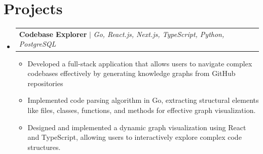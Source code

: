 \documentclass[letterpaper,11pt]{article}
\makeatletter
\newcommand{\resumeItem}[1]{
  \item\small{
    {#1 \vspace{-2pt}}
  }
}
\newcommand{\resumeProjectHeading}[2]{
    \item
    \begin{tabular*}{0.97\textwidth}{l@{\extracolsep{\fill}}r}
      \small#1 & #2 \\
    \end{tabular*}\vspace{-7pt}
}
\newcommand{\resumeSubHeadingListStart}{\begin{itemize}[leftmargin=0.15in, label={}]}
\newcommand{\resumeSubHeadingListEnd}{\end{itemize}}
\newcommand{\resumeItemListStart}{\begin{itemize}}
\newcommand{\resumeItemListEnd}{\end{itemize}\vspace{-5pt}}
\makeatother
\begin{document}
\section{Projects}
    \resumeSubHeadingListStart
        \resumeProjectHeading
          {\textbf{Codebase Explorer} $|$ \normalfont\emph{\small Go, React.js, Next.js, TypeScript, Python, PostgreSQL}}{}
          \resumeItemListStart
            \resumeItem{Developed a full-stack application that allows users to navigate complex codebases effectively by generating knowledge graphs from GitHub repositories}\
            \resumeItem{Implemented code parsing algorithm in Go, extracting structural elements like files, classes, functions, and methods for effective graph visualization.}
            \resumeItem{Designed and implemented a dynamic graph visualization using React and TypeScript, allowing users to interactively explore complex code structures.}
        \resumeItemListEnd
    \resumeSubHeadingListEnd
\end{document}
